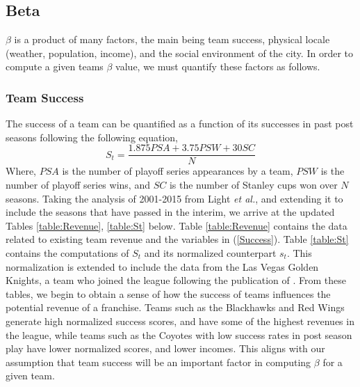 \documentclass[11pt]{report}            %
\begin{document}
\subsection*{Beta}
$\beta$ is a product of many factors, the main being team success, physical locale (weather, population, income), and the social environment of the city\cite{light}. In order to compute a given teams $\beta$ value, we must quantify these factors as follows.
\subsubsection*{Team Success}
The success of a team can be quantified as a function of its successes in past post seasons following the following equation,
\begin{equation}\label{Success}
S_t = \frac{1.875PSA+3.75PSW+30SC}{N}
\end{equation}
Where, $PSA$ is the number of playoff series appearances by a team, $PSW$ is the number of playoff series wins, and $SC$ is the number of Stanley cups won over $N$ seasons. Taking the analysis of 2001-2015 from Light \textit{et al.}\cite{light}, and extending it to include the seasons that have passed in the interim, we arrive at the updated Tables \ref{table:Revenue}, \ref{table:St} below. Table \ref{table:Revenue} contains the data related to existing team revenue and the variables in (\ref{Success}). Table \ref{table:St} contains the computations of $S_t$ and its normalized counterpart $s_t$. This normalization is extended to include the data from the Las Vegas Golden Knights, a team who joined the league following the publication of \cite{light}. From these tables, we begin to obtain a sense of how the success of teams influences the potential revenue of a franchise. Teams such as the Blackhawks and Red Wings generate high normalized success scores, and have some of the highest revenues in the league, while teams such as the Coyotes with low success rates in post season play have lower normalized scores, and lower incomes. This aligns with our assumption that team success will be an important factor in computing $\beta$ for a given team.
\end{document}
